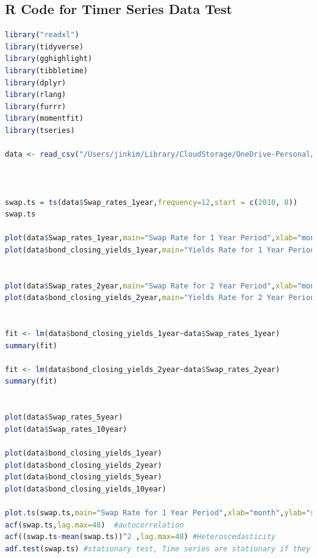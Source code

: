 \documentclass[10pt]{article}
\begin{document}
\subsection{R Code for Timer Series Data Test}
\begin{lstlisting}[language=R]
library("readxl")
library(tidyverse)
library(gghighlight)
library(tibbletime)
library(dplyr)
library(rlang)
library(furrr)
library(momentfit)
library(tseries)

data <- read_csv("/Users/jinkim/Library/CloudStorage/OneDrive-Personal/Aucklanduni/2023 S2/ECON 723/Group Project/data_nz_filled.csv")



swap.ts = ts(data$Swap_rates_1year,frequency=12,start = c(2010, 8))
swap.ts

plot(data$Swap_rates_1year,main="Swap Rate for 1 Year Period",xlab="month",ylab="swap rate in percent",frequency=12,start = c(2010, 8))
plot(data$bond_closing_yields_1year,main="Yields Rate for 1 Year Period",xlab="month",ylab="yields rate in percent",frequency=12,start = c(2010, 8))


plot(data$Swap_rates_2year,main="Swap Rate for 2 Year Period",xlab="month",ylab="swap rate in percent",frequency=12,start = c(2010, 8))
plot(data$bond_closing_yields_2year,main="Yields Rate for 2 Year Period",xlab="month",ylab="yields rate in percent",frequency=12,start = c(2010, 8))


fit <- lm(data$bond_closing_yields_1year~data$Swap_rates_1year)
summary(fit)

fit <- lm(data$bond_closing_yields_2year~data$Swap_rates_2year)
summary(fit)


plot(data$Swap_rates_5year)
plot(data$Swap_rates_10year)

plot(data$bond_closing_yields_1year)
plot(data$bond_closing_yields_2year)
plot(data$bond_closing_yields_5year)
plot(data$bond_closing_yields_10year)

plot.ts(swap.ts,main="Swap Rate for 1 Year Period",xlab="month",ylab="swap rate in percent",frequency=12,start = c(2010, 8))
acf(swap.ts,lag.max=48)  #autocorrelation
acf((swap.ts-mean(swap.ts))^2 ,lag.max=48) #Heteroscedasticity 
adf.test(swap.ts) #stationary test, Time series are stationary if they do not have trend or seasonal effects, p-value is obtained is greater than significance level of 0.05 and the ADF statistic is higher than any of the critical values. Clearly, there is no reason to reject the null hypothesis. So, the time series is in fact non-stationary.


\end{lstlisting}
\end{document}
